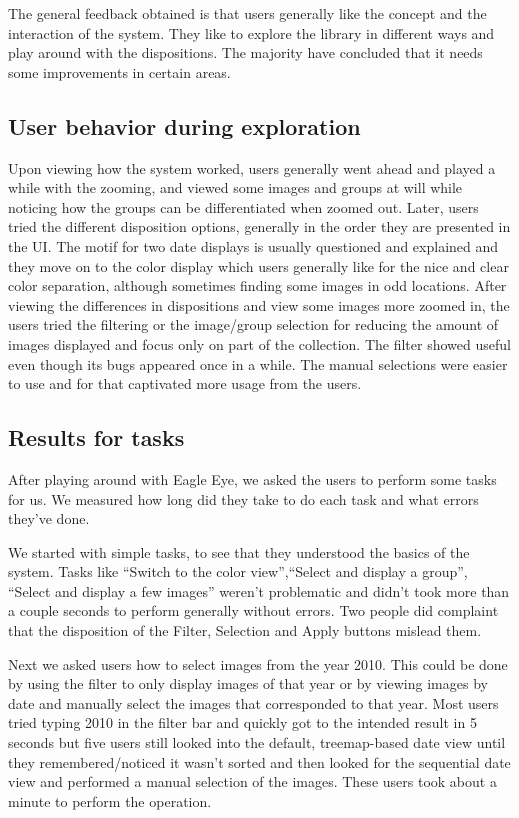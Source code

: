 The general feedback obtained is that users generally like the concept and the interaction of the system. They like to explore the library in different ways and play around with the dispositions. The majority have concluded that it needs some improvements in certain areas.

\subsection{User behavior during exploration}

Upon viewing how the system worked, users generally went ahead and played a while with the zooming, and viewed some images and groups at will while noticing how the groups can be differentiated when zoomed out. Later, users tried the different disposition options, generally in the order they are presented in the \ac{UI}. The motif for two date displays is usually questioned and explained and they move on to the color display which users generally like for the nice and clear color separation, although sometimes finding some images in odd locations. After viewing the differences in dispositions and view some images more zoomed in, the users tried the filtering or the image/group selection for reducing the amount of images displayed and focus only on part of the collection. The filter showed useful even though its bugs appeared once in a while. The manual selections were easier to use and for that captivated more usage from the users.


\subsection{Results for tasks}

After playing around with Eagle Eye, we asked the users to perform some tasks for us. We measured how long did they take to do each task and what errors they've done.

We started with simple tasks, to see that they understood the basics of the system. Tasks like ``Switch to the color view'',``Select and display a group'', ``Select and display a few images'' weren't problematic and didn't took more than a couple seconds to perform generally without errors. Two people did complaint that the disposition of the Filter, Selection and Apply buttons mislead them.

Next we asked users how to select images from the year 2010. This could be done by using the filter to only display images of that year or by viewing images by date and manually select the images that corresponded to that year. Most users tried typing 2010 in the filter bar and quickly got to the intended result in 5 seconds but five users still looked into the default, treemap-based date view until they remembered/noticed it wasn't sorted and then looked for the sequential date view and performed a manual selection of the images. These users took about a minute to perform the operation.

